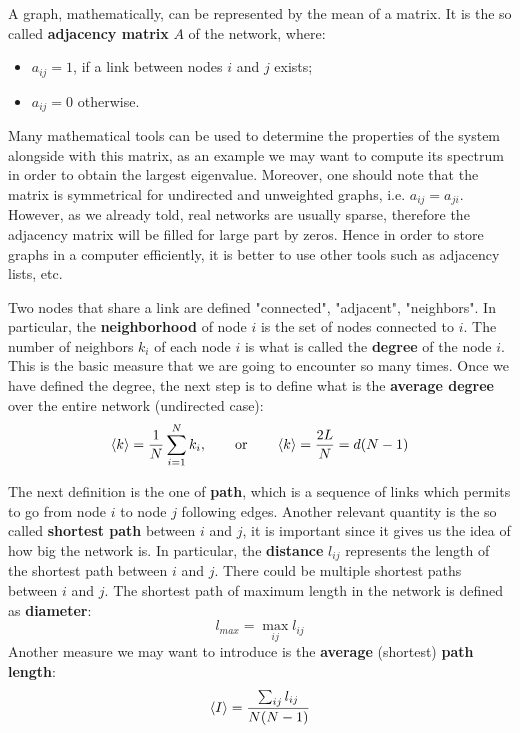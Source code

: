 \documentclass[../main/main.tex]{subfiles}
\begin{document}
A graph, mathematically, can be represented by the mean of a matrix. It is the so called \textbf{adjacency matrix} \( A \) of the network, where:
\begin{itemize}
\item \( a_{ij} = 1 \), if a link between nodes \( i \) and \( j \) exists;
\item \( a_{ij} = 0 \) otherwise.
\end{itemize}
Many mathematical tools can be used to determine the properties of the system alongside with this matrix, as an example we may want to compute its spectrum in order to obtain the largest eigenvalue. Moreover, one should note that the matrix is symmetrical for undirected and unweighted graphs, i.e. \( a_{ij} = a_{ji} \).
However, as we already told, real networks are usually sparse, therefore the adjacency matrix will be filled for large part by zeros. Hence in order to store graphs in a computer efficiently, it is better to use other tools such as adjacency lists, etc.

Two nodes that share a link are defined "connected", "adjacent", "neighbors". In particular, the \textbf{neighborhood} of node \( i \) is the set of nodes connected to \( i \).
The number of neighbors \( k_i \) of each node \( i \) is what is called the \textbf{degree} of the node $i$. This is the basic measure that we are going to encounter so many times. Once we have defined the degree, the next step is to define what is the \textbf{average degree} over the entire network (undirected case):
\begin{equation}
  \expval{k} = \frac{1}{N} \sum_{i=1}^{N} k_i, \qquad \text{or} \qquad \expval{k} = \frac{2L}{N} = d(N-1)
\end{equation}

The next definition is the one of \textbf{path}, which is a sequence of links which permits to go from node \( i \) to node \( j \) following edges. Another relevant quantity is the so called \textbf{shortest path} between \( i \) and \( j \), it is important since it gives us the idea of how big the network is. In particular, the \textbf{distance} \( l_{ij} \) represents the length of the shortest path between \( i \) and \( j \). There could be multiple shortest paths between \( i \) and \( j \).
The shortest path of maximum length in the network is defined as \textbf{diameter}:
\begin{equation*}
  l_{max} = \max_{ij} l_{ij}
\end{equation*}
Another measure we may want to introduce is the \textbf{average} (shortest) \textbf{path length}:
\begin{equation*}
  \expval{I} = \frac{\sum_{ij}^{} l_{ij} }{N(N-1)}
\end{equation*}
\end{document}
